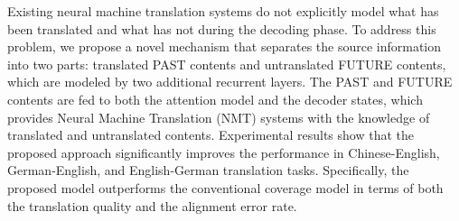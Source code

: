 Existing neural machine translation systems do not explicitly model what has been translated and what has not during the decoding phase. To address this problem, we propose a novel mechanism that separates the source information into two parts: translated PAST contents and untranslated FUTURE contents, which are modeled by two additional recurrent layers. The PAST and FUTURE contents are fed to both the attention model and the decoder states, which provides Neural Machine Translation (NMT) systems with the knowledge of translated and untranslated contents. Experimental results show that the proposed approach significantly improves the performance in Chinese-English, German-English, and English-German translation tasks. Specifically, the proposed model outperforms the conventional coverage model in terms of both the translation quality and the alignment error rate.